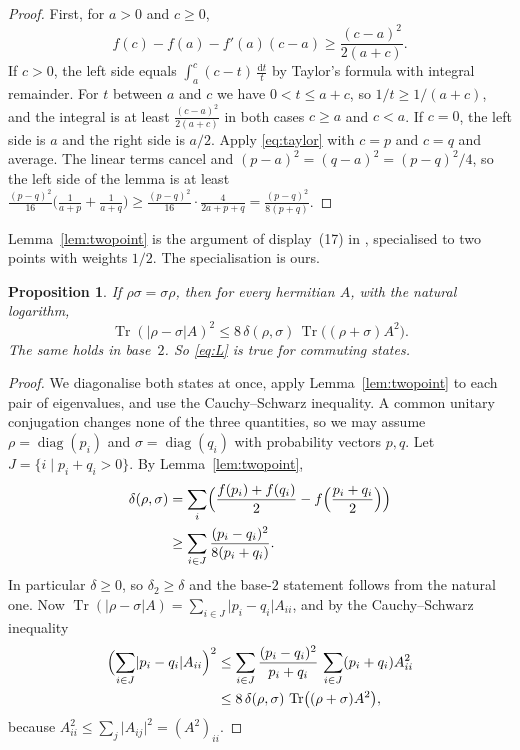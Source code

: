 \documentclass[11pt]{amsart}
\newtheorem{proposition}[theorem]{Proposition}
\theoremstyle{definition}\newtheorem{definition}[theorem]{Definition}
\theoremstyle{remark}\newtheorem{remark}[theorem]{Remark}
\DeclareMathOperator{\Tr}{Tr}
\DeclareMathOperator{\diag}{diag}
\newcommand{\abs}[1]{\lvert #1\rvert}
\newcommand{\dd}{\mathrm{d}}
\begin{document}
\begin{proof}
First, for \(a>0\) and \(c\ge0\),
\begin{equation}\label{eq:taylor}
f(c)-f(a)-f'(a)(c-a)\ge\frac{(c-a)^2}{2(a+c)} .
\end{equation}
If \(c>0\), the left side equals \(\int_a^c(c-t)\,\frac{\dd t}{t}\) by Taylor's formula with integral remainder. For \(t\) between \(a\) and \(c\) we have \(0<t\le a+c\), so \(1/t\ge1/(a+c)\), and the integral is at least \(\frac{(c-a)^2}{2(a+c)}\) in both cases \(c\ge a\) and \(c<a\). If \(c=0\), the left side is \(a\) and the right side is \(a/2\). Apply \eqref{eq:taylor} with \(c=p\) and \(c=q\) and average. The linear terms cancel and \((p-a)^2=(q-a)^2=(p-q)^2/4\), so the left side of the lemma is at least \(\frac{(p-q)^2}{16}\bigl(\frac{1}{a+p}+\frac{1}{a+q}\bigr)\ge\frac{(p-q)^2}{16}\cdot\frac{4}{2a+p+q}=\frac{(p-q)^2}{8(p+q)}\).
\end{proof}

Lemma~\ref{lem:twopoint} is the argument of display~(17) in \cite{ozawa20}, specialised to two points with weights \(1/2\). The specialisation is ours.

\begin{proposition}\label{prop:commuting}
If \(\rho\sigma=\sigma\rho\), then for every hermitian \(A\), with the natural logarithm,
\[
\Tr(\abs{\rho-\sigma}A)^2\le8\,\delta(\rho,\sigma)\,\Tr\bigl((\rho+\sigma)A^2\bigr).
\]
The same holds in base~\(2\). So \eqref{eq:L} is true for commuting states.
\end{proposition}

\begin{proof}
We diagonalise both states at once, apply Lemma~\ref{lem:twopoint} to each pair of eigenvalues, and use the Cauchy--Schwarz inequality. A common unitary conjugation changes none of the three quantities, so we may assume \(\rho=\diag(p_i)\) and \(\sigma=\diag(q_i)\) with probability vectors \(p,q\). Let \(J=\{i\mid p_i+q_i>0\}\). By Lemma~\ref{lem:twopoint},
\begin{align*}
\delta(\rho,\sigma)&=\sum_i\Bigl(\frac{f(p_i)+f(q_i)}{2}-f\Bigl(\frac{p_i+q_i}{2}\Bigr)\Bigr)\\
&\ge\sum_{i\in J}\frac{(p_i-q_i)^2}{8(p_i+q_i)} .
\end{align*}
In particular \(\delta\ge0\), so \(\delta_2\ge\delta\) and the base-\(2\) statement follows from the natural one. Now \(\Tr(\abs{\rho-\sigma}A)=\sum_{i\in J}\abs{p_i-q_i}A_{ii}\), and by the Cauchy--Schwarz inequality
\begin{align*}
\Bigl(\sum_{i\in J}\abs{p_i-q_i}A_{ii}\Bigr)^2&\le\sum_{i\in J}\frac{(p_i-q_i)^2}{p_i+q_i}\,\sum_{i\in J}(p_i+q_i)A_{ii}^2\\
&\le8\,\delta(\rho,\sigma)\,\Tr\bigl((\rho+\sigma)A^2\bigr),
\end{align*}
because \(A_{ii}^2\le\sum_j\abs{A_{ij}}^2=(A^2)_{ii}\).
\end{proof}
\end{document}

